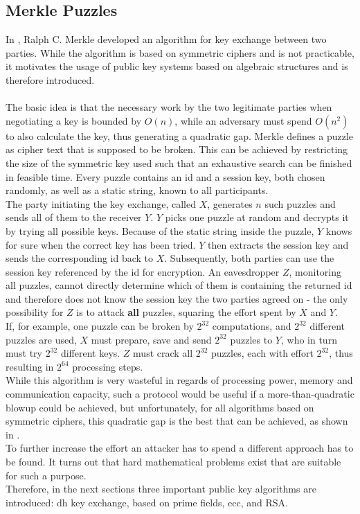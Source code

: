 \subsection{Merkle Puzzles}
In \cite{Merkle}, Ralph C. Merkle developed an algorithm for key exchange between two parties. While the algorithm is based on symmetric ciphers and is
not practicable, it motivates the usage of public key systems based on algebraic structures and is therefore introduced.
\\
\\
The basic idea is that the necessary work by the two legitimate parties when negotiating a key is bounded by $O(n)$, while an adversary must spend $O(n^2)$ to 
also calculate the key, thus generating a quadratic gap. 
Merkle defines a puzzle as cipher text that is supposed to be broken. This can be achieved by restricting the size of the symmetric key used such that an
exhaustive search can be finished in feasible time. Every puzzle contains an id and a session key, both chosen randomly, as well as a static string,
known to all participants.
\\
The party initiating the key exchange, called $X$, generates $n$ such puzzles and sends all of them to the receiver $Y$. $Y$ picks one puzzle at random and
decrypts it by trying all possible keys. Because of the static string inside the puzzle, $Y$ knows for sure when the correct key has been tried.
$Y$ then extracts the session key and sends the corresponding id back to $X$. Subsequently, both parties can use the session key referenced by the id for encryption.
An eavesdropper $Z$, monitoring all puzzles, cannot directly determine which of them is containing the returned id and therefore does not know the session key the 
two parties agreed on - the only possibility for $Z$ is to attack \textbf{all} puzzles, squaring the effort spent by $X$ and $Y$.
\\
If, for example, one puzzle can be broken by $2^{32}$ computations, and $2^{32}$ different puzzles are used, $X$ must prepare, save and send $2^{32}$ puzzles
to $Y$, who in turn must try $2^{32}$ different keys. $Z$ must crack all $2^{32}$ puzzles, each with effort $2^{32}$, thus resulting in $2^{64}$ processing steps.
\\
While this algorithm is very wasteful in regards of processing power, memory and communication capacity, such a protocol would be useful if a more-than-quadratic
blowup could be achieved, but unfortunately, for all algorithms based on symmetric ciphers, this quadratic gap is the best that can be achieved,
as shown in \cite{Barak09merklepuzzles}.   
\\ 
To further increase the effort an attacker has to spend a different approach has to be found. It turns out that hard mathematical problems exist that are 
suitable for such a purpose. 
\\
Therefore, in the next sections three important public key algorithms are introduced: \gls{dh} key exchange, based on prime fields, \gls{ecc}, and RSA.
